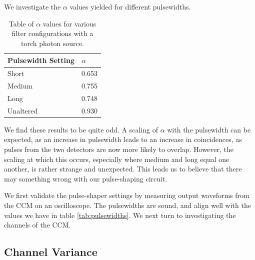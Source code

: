 \documentclass[letterpaper, 11 pt]{article}
\begin{document}
We investigate the $\alpha$ values yielded for different pulsewidths.
\begin{table}[H]
    \centering
    \begin{tabular}{|l|l|}
    \hline
    \textbf{Pulsewidth Setting} & \textbf{$\alpha$} \\ \hline
    Short        & 0.653                   \\ \hline
    Medium        & 0.755                   \\ \hline
    Long        & 0.748                   \\ \hline
    Unaltered                  & 0.930                   \\ \hline
    \end{tabular}
    \caption{Table of $\alpha$ values for various filter configurations with a torch photon source.}
\end{table}\label{tab:pulsewidths}
We find these results to be quite odd. A scaling of $\alpha$ with the pulsewidth can be expected,
as an increase in pulsewidth leads to an increase in coincidences, as pulses from the two detectors are now
more likely to overlap. However, the scaling at which this occurs, especially where medium and long equal one another, is rather strange and unexpected. This leads us to believe that there may something wrong with our pulse-shaping circuit.

We first validate the pulse-shaper settings by measuring output waveforms from the CCM on an oscilloscope.
The pulsewidths are sound, and align well with the values we have in table \ref{tab:pulsewidths}. We
next turn to investigating the channels of the CCM.

\subsection{Channel Variance}
\end{document}
